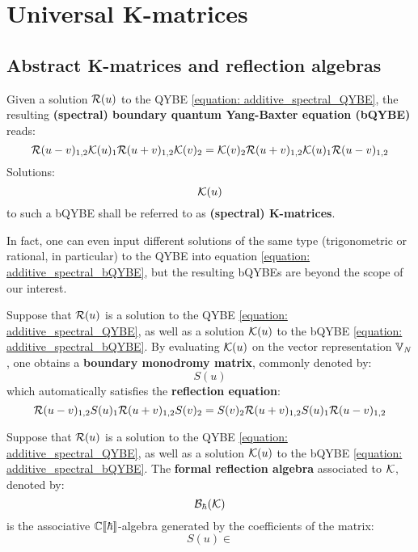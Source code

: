 \section{Universal K-matrices}
    \subsection{Abstract K-matrices and reflection algebras}
        \begin{definition} \label{def: additive_spectral_bQYBE}
            Given a solution $\mathcal{R}(u)$ to the QYBE \eqref{equation: additive_spectral_QYBE}, the resulting \textbf{(spectral) boundary quantum Yang-Baxter equation (bQYBE)} reads:
                \begin{equation} \label{equation: additive_spectral_bQYBE}
                    \mathcal{R}(u - v)_{1, 2} \mathcal{K}(u)_1 \mathcal{R}(u + v)_{1, 2} \mathcal{K}(v)_2 = \mathcal{K}(v)_2 \mathcal{R}(u + v)_{1, 2} \mathcal{K}(u)_1 \mathcal{R}(u - v)_{1, 2} 
                \end{equation}
            Solutions:
                $$\mathcal{K}(u)$$
            to such a bQYBE shall be referred to as \textbf{(spectral) K-matrices}.
        \end{definition}
        \begin{remark}
            In fact, one can even input different solutions of the same type (trigonometric or rational, in particular) to the QYBE into equation \eqref{equation: additive_spectral_bQYBE}, but the resulting bQYBEs are beyond the scope of our interest.
        \end{remark}
    
        \begin{definition} \label{def: boundary_monodromy_matrices}
            Suppose that $\mathcal{R}(u)$ is a solution to the QYBE \eqref{equation: additive_spectral_QYBE}, as well as a solution $\mathcal{K}(u)$ to the bQYBE \eqref{equation: additive_spectral_bQYBE}. By evaluating $\mathcal{K}(u)$ on the vector representation $\mathbb{V}_N$, one obtains a \textbf{boundary monodromy matrix}, commonly denoted by:
                $$S(u)$$
            which automatically satisfies the \textbf{reflection equation}:
                \begin{equation} \label{equation: reflection_equations}
                    \mathcal{R}(u - v)_{1, 2} S(u)_1 \mathcal{R}(u + v)_{1, 2} S(v)_2 = S(v)_2 \mathcal{R}(u + v)_{1, 2} S(u)_1 \mathcal{R}(u - v)_{1, 2} 
                \end{equation}
        \end{definition}
        \begin{definition} \label{def: reflection_algebras}
            Suppose that $\mathcal{R}(u)$ is a solution to the QYBE \eqref{equation: additive_spectral_QYBE}, as well as a solution $\mathcal{K}(u)$ to the bQYBE \eqref{equation: additive_spectral_bQYBE}. The \textbf{formal reflection algebra} associated to $\mathcal{K}$, denoted by:
                $$\mathcal{B}_{\hbar}(\mathcal{K})$$
            is the associative $\mathbb{C}[\![\hbar]\!]$-algebra generated by the coefficients of the matrix:
                $$S(u) \in $$
        \end{definition}

